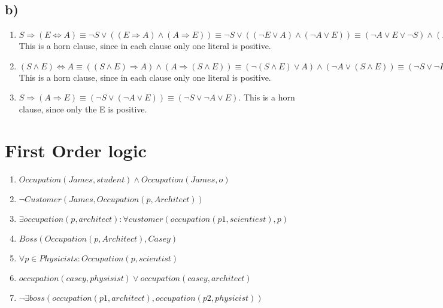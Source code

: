 \documentclass[a4paper]{article}
\begin{document}
\subsection*{b)}
\begin{enumerate}
	\item $S \Rightarrow (E \Leftrightarrow A) \equiv \neg S \lor ((E \Rightarrow A) \land (A \Rightarrow E)) \equiv \neg S \lor ((\neg E \lor A) \land (\neg A \lor E)) \equiv (\neg A \lor E \lor \neg S) \land (A \lor  \neg E \lor \neg S)$ This is a horn clause, since in each clause only one literal is positive.
	\item $(S \land E) \Leftrightarrow A \equiv ((S \land E) \Rightarrow A) \land (A \Rightarrow (S \land E)) \equiv (\neg(S \land E) \lor A) \land (\neg A \lor (S \land E)) \equiv (\neg S \lor \neg E \lor A) \land (\neg A \lor S) \land (\neg A \lor E)$ This is a horn clause, since in each clause only one literal is positive.
	\item $S \Rightarrow (A \Rightarrow E) \equiv (\neg S \lor (\neg A \lor E)) \equiv (\neg S \lor \neg A \lor E)$. This is a horn clause, since only the E is positive.
\end{enumerate}
\section{First Order logic}
\begin{enumerate}
	\item $Occupation(James, student) \land Occupation(James, o)$
	\item $\neg Customer(James, Occupation(p, Architect))$
	\item $\exists occupation(p, architect): \forall customer(occupation(p1, scientiest),p)$
	\item $Boss(Occupation(p, Architect), Casey)$
	\item $\forall p \in  Physicists: Occupation(p, scientist)$
	\item $occupation(casey, physisist) \lor occupation(casey, architect)$
	\item $\neg \exists boss(occupation(p1, architect), occupation(p2, physicist))$
\end{enumerate}
\end{document}

